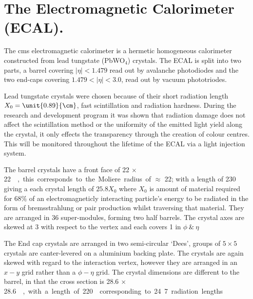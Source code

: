 
\section{The Electromagnetic Calorimeter (ECAL).} %
\label{sec:the_electromagnetic_calorimeter}
The \ac{cms} electromagnetic calorimeter is a hermetic homogeneous calorimeter constructed from lead tungstate (PbWO$_{4}$) crystals. The ECAL is split into two parts, a barrel covering $|\eta| < 1.479$ read out by avalanche photodiodes and the two end-caps covering $1.479 < |\eta| < 3.0$, read out by vacuum phototriodes.

Lead tungstate crystals were chosen because of their short radiation length $X_{0}= \unit{0.89}{\cm}$, fast scintillation and radiation hardness. During the research and development program it was shown that radiation damage does not affect the scintillation method or the uniformity of the emitted light yield along the crystal, it only effects the transparency through the creation of colour centres. This will be monitored throughout the lifetime of the ECAL via a light injection system\cite{Smith:2000p5245}.

The barrel crystals have a front face of \unit{22 $\times$ 22}{\mm\squared}, 
this corresponds to the Moliere radius of $\approx $ \unit{22}{\mm}; with a 
length of \unit{230}{\mm} giving a each crystal length of $25.8 X_{0}$ where $X_{0}$ is amount of material required for 68$\%$ of an electromagneticly interacting particle's energy to be radiated in the form of bremsstrahlung or pair production whilst traversing that material. They are arranged in 36 super-modules, forming two half barrels. The crystal axes are skewed at \unit{3}{\degree} with respect to the vertex and each covers \unit{1}{\degree} in $\phi ~ \& ~ \eta$

The End cap crystals are arranged in two semi-circular `Dees', groups of 
$5\times 5$ crystals are canter-levered on a aluminium backing plate. The 
crystals are again skewed with regard to the interaction vertex, however they 
are arranged in an $x-y$ grid rather than a $\phi - \eta$ grid. The crystal 
dimensions are different to the barrel, in that the cross section is \unit{28.6 
$\times$ 28.6}{\mm\squared}, with a length of \unit{220}{\mm} corresponding to 
24.7 radiation lengths

